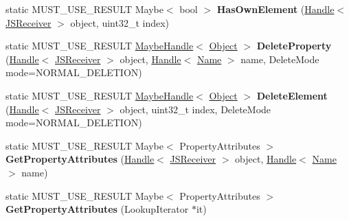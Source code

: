 \begin{DoxyCompactItemize}
\item 
\hypertarget{classv8_1_1internal_1_1_j_s_receiver_a1ee1dc377348cf9e2e0fc1f041e18577}{}static M\+U\+S\+T\+\_\+\+U\+S\+E\+\_\+\+R\+E\+S\+U\+L\+T Maybe$<$ bool $>$ {\bfseries Has\+Own\+Element} (\hyperlink{classv8_1_1internal_1_1_handle}{Handle}$<$ \hyperlink{classv8_1_1internal_1_1_j_s_receiver}{J\+S\+Receiver} $>$ object, uint32\+\_\+t index)\label{classv8_1_1internal_1_1_j_s_receiver_a1ee1dc377348cf9e2e0fc1f041e18577}

\item 
\hypertarget{classv8_1_1internal_1_1_j_s_receiver_af6a9d22e06da3a92897155805d25c132}{}static M\+U\+S\+T\+\_\+\+U\+S\+E\+\_\+\+R\+E\+S\+U\+L\+T \hyperlink{classv8_1_1internal_1_1_maybe_handle}{Maybe\+Handle}$<$ \hyperlink{classv8_1_1internal_1_1_object}{Object} $>$ {\bfseries Delete\+Property} (\hyperlink{classv8_1_1internal_1_1_handle}{Handle}$<$ \hyperlink{classv8_1_1internal_1_1_j_s_receiver}{J\+S\+Receiver} $>$ object, \hyperlink{classv8_1_1internal_1_1_handle}{Handle}$<$ \hyperlink{classv8_1_1internal_1_1_name}{Name} $>$ name, Delete\+Mode mode=N\+O\+R\+M\+A\+L\+\_\+\+D\+E\+L\+E\+T\+I\+O\+N)\label{classv8_1_1internal_1_1_j_s_receiver_af6a9d22e06da3a92897155805d25c132}

\item 
\hypertarget{classv8_1_1internal_1_1_j_s_receiver_ac662362083caced34848f3ef1b18522b}{}static M\+U\+S\+T\+\_\+\+U\+S\+E\+\_\+\+R\+E\+S\+U\+L\+T \hyperlink{classv8_1_1internal_1_1_maybe_handle}{Maybe\+Handle}$<$ \hyperlink{classv8_1_1internal_1_1_object}{Object} $>$ {\bfseries Delete\+Element} (\hyperlink{classv8_1_1internal_1_1_handle}{Handle}$<$ \hyperlink{classv8_1_1internal_1_1_j_s_receiver}{J\+S\+Receiver} $>$ object, uint32\+\_\+t index, Delete\+Mode mode=N\+O\+R\+M\+A\+L\+\_\+\+D\+E\+L\+E\+T\+I\+O\+N)\label{classv8_1_1internal_1_1_j_s_receiver_ac662362083caced34848f3ef1b18522b}

\item 
\hypertarget{classv8_1_1internal_1_1_j_s_receiver_a7b9892f62580064e9a749bc82cc20f50}{}static M\+U\+S\+T\+\_\+\+U\+S\+E\+\_\+\+R\+E\+S\+U\+L\+T Maybe$<$ Property\+Attributes $>$ {\bfseries Get\+Property\+Attributes} (\hyperlink{classv8_1_1internal_1_1_handle}{Handle}$<$ \hyperlink{classv8_1_1internal_1_1_j_s_receiver}{J\+S\+Receiver} $>$ object, \hyperlink{classv8_1_1internal_1_1_handle}{Handle}$<$ \hyperlink{classv8_1_1internal_1_1_name}{Name} $>$ name)\label{classv8_1_1internal_1_1_j_s_receiver_a7b9892f62580064e9a749bc82cc20f50}

\item 
\hypertarget{classv8_1_1internal_1_1_j_s_receiver_a8fd15767acd469d4de9243af795c8919}{}static M\+U\+S\+T\+\_\+\+U\+S\+E\+\_\+\+R\+E\+S\+U\+L\+T Maybe$<$ Property\+Attributes $>$ {\bfseries Get\+Property\+Attributes} (Lookup\+Iterator $\ast$it)\label{classv8_1_1internal_1_1_j_s_receiver_a8fd15767acd469d4de9243af795c8919}


\end{DoxyCompactItemize}

